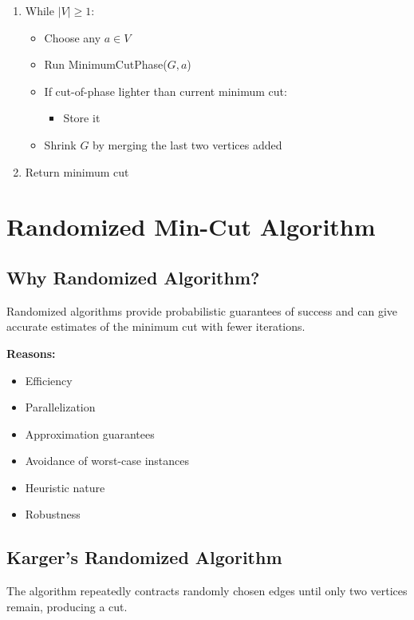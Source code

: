 \documentclass[12pt]{article}
\begin{document}
\begin{enumerate}
    \item While $|V| \ge 1$:
    \begin{itemize}
        \item Choose any $a \in V$
        \item Run MinimumCutPhase($G,a$)
        \item If cut-of-phase lighter than current minimum cut:
        \begin{itemize}
            \item Store it
        \end{itemize}
        \item Shrink $G$ by merging the last two vertices added
    \end{itemize}
    \item Return minimum cut
\end{enumerate}

\section{Randomized Min-Cut Algorithm}

\subsection{Why Randomized Algorithm?}

Randomized algorithms provide probabilistic guarantees of success and can give accurate estimates of the minimum cut with fewer iterations.

\textbf{Reasons:}
\begin{itemize}
    \item Efficiency
    \item Parallelization
    \item Approximation guarantees
    \item Avoidance of worst-case instances
    \item Heuristic nature
    \item Robustness
\end{itemize}

\subsection{Karger’s Randomized Algorithm}

The algorithm repeatedly contracts randomly chosen edges until only two vertices remain, producing a cut.
\end{document}
